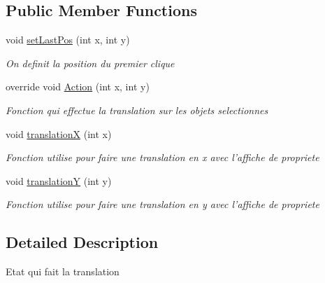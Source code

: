 \subsection*{Public Member Functions}
\begin{DoxyCompactItemize}
\item 
void \hyperlink{class_interface_graphique_1_1patron__state_1_1_translation_state_af59b2b8b1160afb218305427f7499f9d}{set\-Last\-Pos} (int x, int y)
\begin{DoxyCompactList}\small\item\em On definit la position du premier clique \end{DoxyCompactList}\item 
override void \hyperlink{class_interface_graphique_1_1patron__state_1_1_translation_state_ab5ba5dd1c3941c219f81d01dbcfe2a60}{Action} (int x, int y)
\begin{DoxyCompactList}\small\item\em Fonction qui effectue la translation sur les objets selectionnes \end{DoxyCompactList}\item 
void \hyperlink{class_interface_graphique_1_1patron__state_1_1_translation_state_a6d21be9b23eddc861d82debe536ce3fc}{translation\-X} (int x)
\begin{DoxyCompactList}\small\item\em Fonction utilise pour faire une translation en x avec l'affiche de propriete \end{DoxyCompactList}\item 
void \hyperlink{class_interface_graphique_1_1patron__state_1_1_translation_state_af2d245a91f238ff1c53fad89e94f549e}{translation\-Y} (int y)
\begin{DoxyCompactList}\small\item\em Fonction utilise pour faire une translation en y avec l'affiche de propriete \end{DoxyCompactList}\end{DoxyCompactItemize}


\subsection{Detailed Description}
Etat qui fait la translation 



